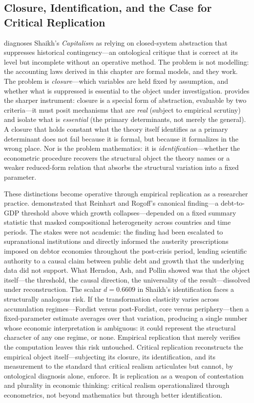 \documentclass[11pt,a4paper]{article}
\begin{document}
\subsection{Closure, Identification, and the Case for Critical Replication}
\label{sec:case_for_cr}

\citet{Patomaki2019} diagnoses Shaikh's \emph{Capitalism} as relying on closed-system abstraction that suppresses historical contingency---an ontological critique that is correct at its level but incomplete without an operative method. The problem is not modelling: the accounting laws derived in this chapter are formal models, and they work. The problem is \emph{closure}---which variables are held fixed by assumption, and whether what is suppressed is essential to the object under investigation. \citet{Nikiforos2020} provides the sharper instrument: closure is a special form of abstraction, evaluable by two criteria---it must posit mechanisms that are \emph{real} (subject to empirical scrutiny) and isolate what is \emph{essential} (the primary determinants, not merely the general). A closure that holds constant what the theory itself identifies as a primary determinant does not fail because it is formal, but because it formalizes in the wrong place. Nor is the problem mathematics: it is \emph{identification}---whether the econometric procedure recovers the structural object the theory names or a weaker reduced-form relation that absorbs the structural variation into a fixed parameter.

These distinctions become operative through empirical replication as a researcher practice. \citet{HAP2014} demonstrated that Reinhart and Rogoff's canonical finding---a debt-to-GDP threshold above which growth collapses---depended on a fixed summary statistic that masked compositional heterogeneity across countries and time periods. The stakes were not academic: the finding had been escalated to supranational institutions and directly informed the austerity prescriptions imposed on debtor economies throughout the post-crisis period, lending scientific authority to a causal claim between public debt and growth that the underlying data did not support. What Herndon, Ash, and Pollin showed was that the object itself---the threshold, the causal direction, the universality of the result---dissolved under reconstruction. The scalar $d = 0.6609$ in Shaikh's identification faces a structurally analogous risk. If the transformation elasticity varies across accumulation regimes---Fordist versus post-Fordist, core versus periphery---then a fixed-parameter estimate averages over that variation, producing a single number whose economic interpretation is ambiguous: it could represent the structural character of any one regime, or none. Empirical replication that merely verifies the computation leaves this risk untouched. Critical replication reconstructs the empirical object itself---subjecting its closure, its identification, and its measurement to the standard that critical realism articulates but cannot, by ontological diagnosis alone, enforce. It is replication as a weapon of contestation and plurality in economic thinking: critical realism operationalized through econometrics, not beyond mathematics but through better identification.
\end{document}
